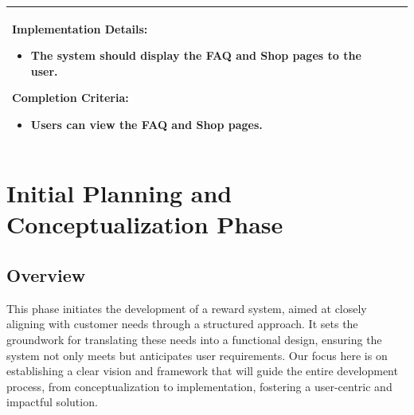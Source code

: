 \begin{longtable}{ | p{} | p{} | }
\begin{itemize}
    \end{itemize}
    \textbf{Implementation Details:} \newline
    \begin{itemize}
        \item The system should display the FAQ and Shop pages to the user.
    \end{itemize}
    \textbf{Completion Criteria:} \newline
    \begin{itemize}
        \item Users can view the FAQ and Shop pages.
    \end{itemize} \\
    \hline
\end{longtable}

\section{Initial Planning and Conceptualization Phase}

\subsection{Overview}
This phase initiates the development of a reward system, aimed at closely aligning with customer needs through a structured approach. It sets the groundwork for translating these needs into a functional design, ensuring the system not only meets but anticipates user requirements. Our focus here is on establishing a clear vision and framework that will guide the entire development process, from conceptualization to implementation, fostering a user-centric and impactful solution.

